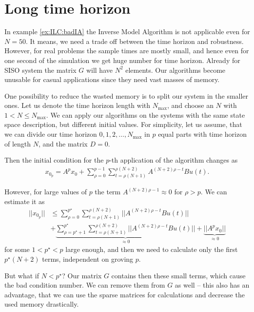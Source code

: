 \section{Long time horizon}

	In example \ref{ex:ILC:badIA} the Inverse Model Algorithm is not applicable even for $N = 50$. 
	It means, we need a trade off between the time horizon and robustness.
	However, for real problems the sample times are mostly small, and hence even for one second of the simulation we get huge number for time horizon. Already for SISO system the matrix $G$ will have $N^2$ elements. Our algorithms become unusable for casual applications since they need vast masses of memory.	
	
	One possibility to reduce the wasted memory is to split our system in the smaller ones. Let us denote the time horizon length with $N_{\max}$, and choose an $N$ with $1<N\leq N_{\max}$. 
	We can apply our algorithms on the systems with the same state space description, but different initial values. For simplicity, let us assume, that we can divide our time horizon $0,1,2,\dots, N_{\max}$ in $p$ equal parts with time horizon of length $N$, and the matrix $D = 0$. 
	
	Then the initial condition for the $p$-th application of the algorithm changes as 
	\begin{align}
	x_{0_p}= A^p x_0 + \sum_{\rho = 0}^{p - 1} \sum_{t = \rho (N + 1)}^{\rho (N+2)} A^{(N+2)\rho - t} B u(t). 
	\end{align}
	
	However, for large values of $p$ the term $A^{(N+2)\rho - 1 }\approx 0$ for $\rho > p$.
	We can estimate it as 
	\begin{align}
	||x_{0_p}|| &\leq  \sum_{\rho = 0}^{p^{\star}} \sum_{t = \rho (N + 1)}^{\rho (N+2)} ||A^{(N+2)\rho - t} B u(t)|| \\
	&+
	\underbrace{\sum_{\rho = p^\star+1}^{p^{\star}} \sum_{t = \rho (N + 1)}^{\rho (N+2)} ||A^{(N+2)\rho - t} B u(t)||}_{\approx 0} + \underbrace{||A^p x_0||}_{\approx 0} 
	\end{align}
	for some $1<p^{\star}<p$ large enough, and then we need to calculate only the first $p^\star (N+2)$ terms, independent on groving $p$. 
	
	But what if $N < p^\star$? Our matrix $G$ contains then these small terms, which cause the bad condition number. 
	We can remove them from $G$ as well -- this also has an advantage, that we can use the sparse matrices for calculations and decrease the used memory drastically. 
	
